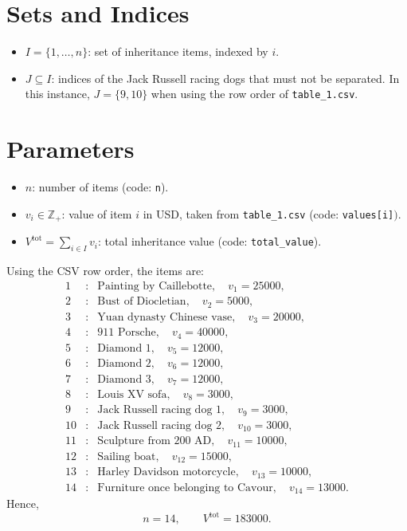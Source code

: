 \section*{Sets and Indices}

\begin{itemize}
    \item $I = \{1,\dots,n\}$: set of inheritance items, indexed by $i$.
    \item $J \subseteq I$: indices of the Jack Russell racing dogs that must not be separated. In this instance, $J=\{9,10\}$ when using the row order of \texttt{table\_1.csv}.
\end{itemize}

\section*{Parameters}

\begin{itemize}
    \item $n$: number of items (code: \texttt{n}).
    \item $v_i \in \mathbb{Z}_{+}$: value of item $i$ in USD, taken from \texttt{table\_1.csv} (code: \texttt{values[i]}$)$.
    \item $V^{\text{tot}} = \sum_{i \in I} v_i$: total inheritance value (code: \texttt{total\_value}).
\end{itemize}

Using the CSV row order, the items are:
\[
\begin{array}{rcl}
1&:&\text{Painting by Caillebotte},\quad v_1=25000,\\
2&:&\text{Bust of Diocletian},\quad v_2=5000,\\
3&:&\text{Yuan dynasty Chinese vase},\quad v_3=20000,\\
4&:&\text{911 Porsche},\quad v_4=40000,\\
5&:&\text{Diamond 1},\quad v_5=12000,\\
6&:&\text{Diamond 2},\quad v_6=12000,\\
7&:&\text{Diamond 3},\quad v_7=12000,\\
8&:&\text{Louis XV sofa},\quad v_8=3000,\\
9&:&\text{Jack Russell racing dog 1},\quad v_9=3000,\\
10&:&\text{Jack Russell racing dog 2},\quad v_{10}=3000,\\
11&:&\text{Sculpture from 200 AD},\quad v_{11}=10000,\\
12&:&\text{Sailing boat},\quad v_{12}=15000,\\
13&:&\text{Harley Davidson motorcycle},\quad v_{13}=10000,\\
14&:&\text{Furniture once belonging to Cavour},\quad v_{14}=13000.
\end{array}
\]
Hence,
\[
n=14,\qquad V^{\text{tot}}=183000.
\]

